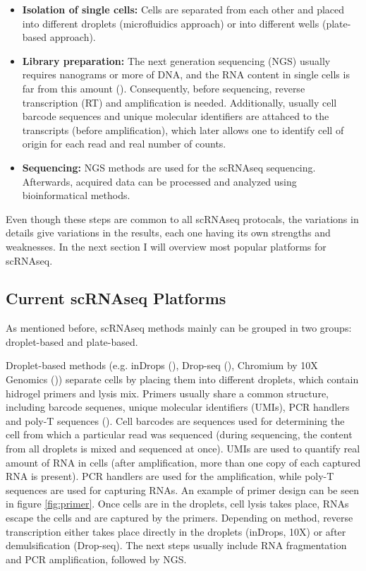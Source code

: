 \begin{itemize}
  \item \textbf{Isolation of single cells:} Cells are separated from each other
  and placed into different droplets (microfluidics approach)
  or into different wells (plate-based approach).
  \item \textbf{Library preparation:} The next generation sequencing (NGS) usually requires nanograms or more of DNA,
  and the RNA content in single cells is far from this amount (\cite{Wu2017}).
  Consequently, before sequencing, reverse transcription (RT) and amplification is needed.
  Additionally, usually cell barcode sequences and unique molecular identifiers are attahced to the transcripts (before amplification),
  which later allows one to identify cell of origin for each read and real number of counts.
  \item \textbf{Sequencing:} NGS methods are used for the scRNAseq sequencing.
  Afterwards, acquired data can be processed and analyzed using bioinformatical methods.
\end{itemize}

Even though these steps are common to all scRNAseq protocals,
the variations in details give variations in the results, each one having its own strengths and weaknesses.
In the next section I will overview most popular platforms for scRNAseq.

\subsection{Current scRNAseq Platforms}

As mentioned before, scRNAseq methods mainly can be grouped in two groups: droplet-based and plate-based.

Droplet-based methods (e.g. inDrops (\cite{Klein2015}), Drop-seq (\cite{Macosko2015}),
Chromium by 10X Genomics (\cite{Zheng2017}))
separate cells by placing them into different droplets, which contain hidrogel primers and lysis mix.
Primers usually share a common structure, including barcode sequenes, unique molecular identifiers (UMIs),
PCR handlers and poly-T sequences (\cite{Zhang2019}).
Cell barcodes are sequences used for determining the cell from which a particular read was sequenced
(during sequencing, the content from all droplets is mixed and sequenced at once).
UMIs are used to quantify real amount of RNA in cells
(after amplification, more than one copy of each captured RNA is present).
PCR handlers are used for the amplification, while poly-T sequences are used for capturing RNAs.
An example of primer design can be seen in figure \ref{fig:primer}.
Once cells are in the droplets, cell lysis takes place, RNAs escape the cells and are captured by the primers.
Depending on method,
reverse transcription either takes place directly in the droplets (inDrops, 10X) or after demulsification (Drop-seq).
The next steps usually include RNA fragmentation and PCR amplification, followed by NGS.

